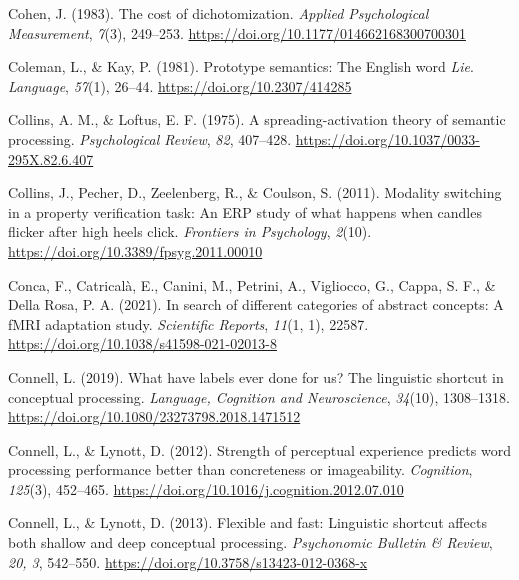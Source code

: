 \documentclass[
  12pt,
  man,floatsintext]{apa7}
\newlength{\cslhangindent}
\newlength{\cslentryspacingunit} %
\newenvironment{CSLReferences}[2] %
 {%
  \setlength{\parindent}{0pt}
  \ifodd #1
  \let\oldpar\par
  \def\par{\hangindent=\cslhangindent\oldpar}
  \fi
  \setlength{\parskip}{#2\cslentryspacingunit}
 }%
 {}
\begin{document}
\begin{CSLReferences}{1}{0}
\leavevmode{}%
Cohen, J. (1983). The cost of dichotomization. \emph{Applied Psychological Measurement}, \emph{7}(3), 249--253. \url{https://doi.org/10.1177/014662168300700301}

\leavevmode{}%
Coleman, L., \& Kay, P. (1981). Prototype semantics: {The English} word {\emph{Lie}}. \emph{Language}, \emph{57}(1), 26--44. \url{https://doi.org/10.2307/414285}

\leavevmode{}%
Collins, A. M., \& Loftus, E. F. (1975). A spreading-activation theory of semantic processing. \emph{Psychological Review}, \emph{82}, 407--428. \url{https://doi.org/10.1037/0033-295X.82.6.407}

\leavevmode{}%
Collins, J., Pecher, D., Zeelenberg, R., \& Coulson, S. (2011). Modality switching in a property verification task: {An} {ERP} study of what happens when candles flicker after high heels click. \emph{Frontiers in Psychology}, \emph{2}(10). \url{https://doi.org/10.3389/fpsyg.2011.00010}

\leavevmode{}%
Conca, F., Catricalà, E., Canini, M., Petrini, A., Vigliocco, G., Cappa, S. F., \& Della Rosa, P. A. (2021). In search of different categories of abstract concepts: A {fMRI} adaptation study. \emph{Scientific Reports}, \emph{11}(1, 1), 22587. \url{https://doi.org/10.1038/s41598-021-02013-8}

\leavevmode{}%
Connell, L. (2019). What have labels ever done for us? {The} linguistic shortcut in conceptual processing. \emph{Language, Cognition and Neuroscience}, \emph{34}(10), 1308--1318. \url{https://doi.org/10.1080/23273798.2018.1471512}

\leavevmode{}%
Connell, L., \& Lynott, D. (2012). Strength of perceptual experience predicts word processing performance better than concreteness or imageability. \emph{Cognition}, \emph{125}(3), 452--465. \url{https://doi.org/10.1016/j.cognition.2012.07.010}

\leavevmode{}%
Connell, L., \& Lynott, D. (2013). Flexible and fast: {Linguistic} shortcut affects both shallow and deep conceptual processing. \emph{Psychonomic Bulletin \& Review}, \emph{20, 3}, 542--550. \url{https://doi.org/10.3758/s13423-012-0368-x}


\end{CSLReferences}
\end{document}
